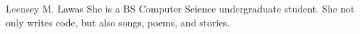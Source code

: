 \documentclass[journal]{IEEE/IEEEtran}
\newcommand{\ADVISEE}{Leensey M. Lawas}
\begin{document}




\begin{biography}{\ADVISEE}
She is a BS Computer Science undergraduate student. She not only writes code, but also songs, poems, and stories.
\end{biography}
\end{document}
